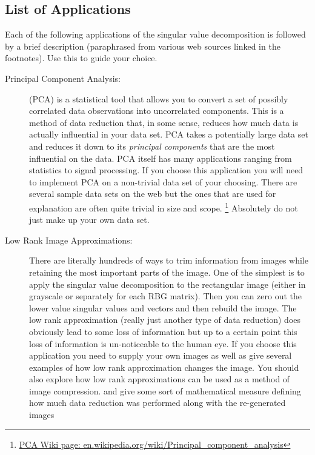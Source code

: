 \subsection*{List of Applications}
Each of the following applications of the singular value decomposition is followed by a
brief description (paraphrased from various web sources linked in the footnotes).  Use
this to guide your choice.
\begin{description}
    \item[Principal Component Analysis:] (PCA) is a statistical tool that allows you to
        convert a set of possibly correlated data observations into uncorrelated
        components.  This is a method of data reduction that, in some sense, reduces how much
        data is actually influential in your data set.  PCA takes
        a potentially large data set and reduces it down to its {\it principal
        components} that are the most influential on the data.  PCA itself has many
        applications ranging from statistics to signal processing.  If you choose this
        application you will need to implement PCA on a non-trivial data set of your
        choosing.  There are several sample data sets on the web but the
        ones that are used for explanation are often quite trivial in size
        and scope.  \footnote{\href{https://en.wikipedia.org/wiki/Principal_component_analysis}{PCA
        Wiki page: en.wikipedia.org/wiki/Principal\_component\_analysis}}  Absolutely do
        not just make up your own data set.
    \item[Low Rank Image Approximations:] There are literally hundreds of ways to trim
        information from images while retaining the most important parts of the image.  One of the simplest is to apply the singular value decomposition to the
        rectangular image (either in grayscale or separately for each RBG matrix).  Then
        you can zero out the lower value singular values and vectors and then rebuild the
        image.  The
        low rank approximation (really just another type of data reduction) does obviously lead to some loss of information but up to a certain point
        this loss of information is un-noticeable to the human eye.  If you choose this
        application you need to supply your own images as well as give several examples of
        how low rank approximation changes the image.  You should also 
        explore how low rank approximations can be used as a method of image compression.  and give some sort of mathematical measure
        defining how much data reduction was performed along with the re-generated images

\end{description}
